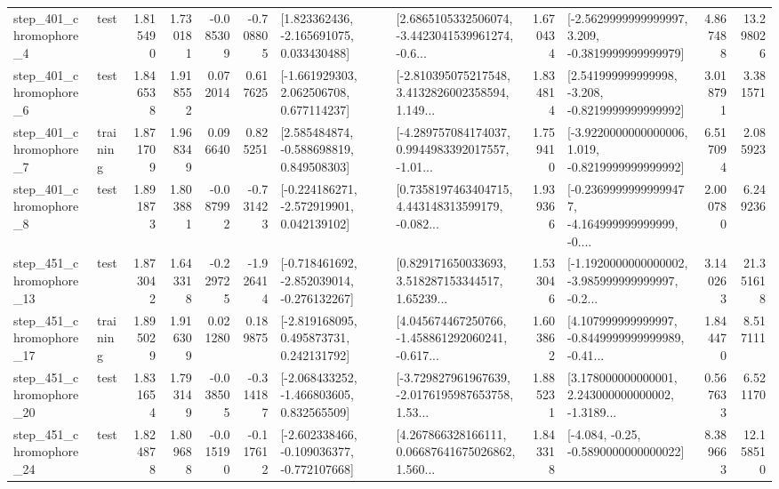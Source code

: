 \begin{tabular}{llrrrrllrlrr}
   step\_401\_chromophore\_4 &      test &      1.815490 &    1.730181 &     -0.085309 & -0.708805 &    [1.823362436, -2.165691075, 0.033430488] &  [2.6865105332506074, -3.4423041539961274, -0.6... &       1.670434 &  [-2.5629999999999997, 3.209, -0.3819999999999979] &            4.867488 &         13.298026 \\
   step\_401\_chromophore\_6 &      test &      1.846538 &    1.918552 &      0.072014 &  0.617625 &    [-1.661929303, 2.062506708, 0.677114237] &  [-2.810395075217548, 3.4132826002358594, 1.149... &       1.834814 &   [2.541999999999998, -3.208, -0.8219999999999992] &            3.018791 &          3.381571 \\
   step\_401\_chromophore\_7 &  training &      1.871709 &    1.968349 &      0.096640 &  0.825251 &    [2.585484874, -0.588698819, 0.849508303] &  [-4.289757084174037, 0.9944983392017557, -1.01... &       1.759410 &  [-3.9220000000000006, 1.019, -0.8219999999999992] &            6.517094 &          2.085923 \\
   step\_401\_chromophore\_8 &      test &      1.891873 &    1.803881 &     -0.087992 & -0.731423 &   [-0.224186271, -2.572919901, 0.042139102] &  [0.7358197463404715, 4.443148313599179, -0.082... &       1.939366 &  [-0.23699999999999477, -4.164999999999999, -0.... &            2.000780 &          6.249236 \\
  step\_451\_chromophore\_13 &      test &      1.873042 &    1.643318 &     -0.229725 & -1.926414 &  [-0.718461692, -2.852039014, -0.276132267] &  [0.829171650033693, 3.518287153344517, 1.65239... &       1.533046 &  [-1.1920000000000002, -3.985999999999997, -0.2... &            3.140263 &         21.351618 \\
  step\_451\_chromophore\_17 &  training &      1.895029 &    1.916309 &      0.021280 &  0.189875 &    [-2.819168095, 0.495873731, 0.242131792] &  [4.045674467250766, -1.458861292060241, -0.617... &       1.603862 &  [4.107999999999997, -0.8449999999999989, -0.41... &            1.844470 &          8.517111 \\
  step\_451\_chromophore\_20 &      test &      1.831654 &    1.793149 &     -0.038505 & -0.314187 &   [-2.068433252, -1.466803605, 0.832565509] &  [-3.729827961967639, -2.0176195987653758, 1.53... &       1.885231 &  [3.178000000000001, 2.243000000000002, -1.3189... &            0.567633 &          6.521170 \\
  step\_451\_chromophore\_24 &      test &      1.824878 &    1.809688 &     -0.015190 & -0.117612 &  [-2.602338466, -0.109036377, -0.772107668] &  [4.267866328166111, 0.06687641675026862, 1.560... &       1.843318 &               [-4.084, -0.25, -0.5890000000000022] &            8.389663 &         12.158510 \\

\end{tabular}
